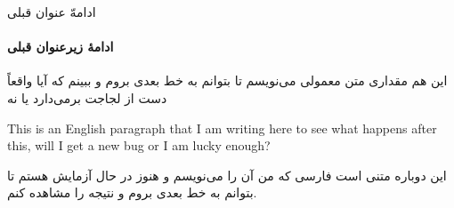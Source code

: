 \documentclass{beamer}
\begin{document}
\begin{frame}{ادامهّ عنوان قبلی}
\framesubtitle{ادامهٔ زیرعنوان قبلی}
این هم مقداری متن معمولی می‌نویسم تا بتوانم به خط بعدی بروم و ببینم که آیا واقعاً  دست از لجاجت برمی‌دارد یا نه
\begin{english}
This is an English paragraph that I am writing here to see what happens after this, will I get a new bug or I am lucky enough?
\end{english}
این دوباره متنی است فارسی که من آن را می‌نویسم و هنوز در حال آزمایش هستم تا بتوانم به خط بعدی بروم و نتیجه را مشاهده کنم.
\end{frame}
\end{document}

